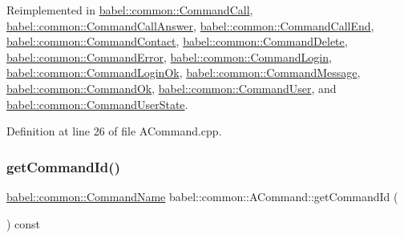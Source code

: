 Reimplemented in \mbox{\hyperlink{classbabel_1_1common_1_1_command_call_a008efa5d4ae4284c391f911b4708f99a}{babel\+::common\+::\+Command\+Call}}, \mbox{\hyperlink{classbabel_1_1common_1_1_command_call_answer_a5c1c304db1d62ce4a1c231c10daaa58a}{babel\+::common\+::\+Command\+Call\+Answer}}, \mbox{\hyperlink{classbabel_1_1common_1_1_command_call_end_a76cf3bf0f091421c71d9e98ca2feb4e0}{babel\+::common\+::\+Command\+Call\+End}}, \mbox{\hyperlink{classbabel_1_1common_1_1_command_contact_a660c56eaf8a3ec532ba18e11292554df}{babel\+::common\+::\+Command\+Contact}}, \mbox{\hyperlink{classbabel_1_1common_1_1_command_delete_ac57ab78ea9b285a59834ca035d3cb7de}{babel\+::common\+::\+Command\+Delete}}, \mbox{\hyperlink{classbabel_1_1common_1_1_command_error_af93f8813d74db60501ee4d079e983218}{babel\+::common\+::\+Command\+Error}}, \mbox{\hyperlink{classbabel_1_1common_1_1_command_login_a34e71a8dc0447a276907444a7e6b2ae6}{babel\+::common\+::\+Command\+Login}}, \mbox{\hyperlink{classbabel_1_1common_1_1_command_login_ok_af7bbc68d6cbe71a9935b19c19fdf0592}{babel\+::common\+::\+Command\+Login\+Ok}}, \mbox{\hyperlink{classbabel_1_1common_1_1_command_message_a930b0c028e19e070a7c7b54d4322d64e}{babel\+::common\+::\+Command\+Message}}, \mbox{\hyperlink{classbabel_1_1common_1_1_command_ok_a50c500fb74111c9e3b0b90a53fedc003}{babel\+::common\+::\+Command\+Ok}}, \mbox{\hyperlink{classbabel_1_1common_1_1_command_user_ac23ded08ec9e57e2a5f3c7374d9fa232}{babel\+::common\+::\+Command\+User}}, and \mbox{\hyperlink{classbabel_1_1common_1_1_command_user_state_adab3d234b9ced9224e3036802cc2794d}{babel\+::common\+::\+Command\+User\+State}}.



Definition at line 26 of file A\+Command.\+cpp.

\mbox{\label{classbabel_1_1common_1_1_a_command_aae2b10c516ccefc465061e1ad447c86b}} 
\subsubsection{\texorpdfstring{get\+Command\+Id()}{getCommandId()}}
{\footnotesize\ttfamily \mbox{\hyperlink{namespacebabel_1_1common_a2d31f246c776da6bf656bd71e86cbb2c}{babel\+::common\+::\+Command\+Name}} babel\+::common\+::\+A\+Command\+::get\+Command\+Id (\begin{DoxyParamCaption}{ }\end{DoxyParamCaption}) const}



